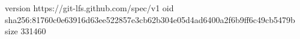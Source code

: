 version https://git-lfs.github.com/spec/v1
oid sha256:81760c0e63916d63ee522857e3cb62b304e05d4ad6400a2f6b9ff6c49cb5479b
size 331460
